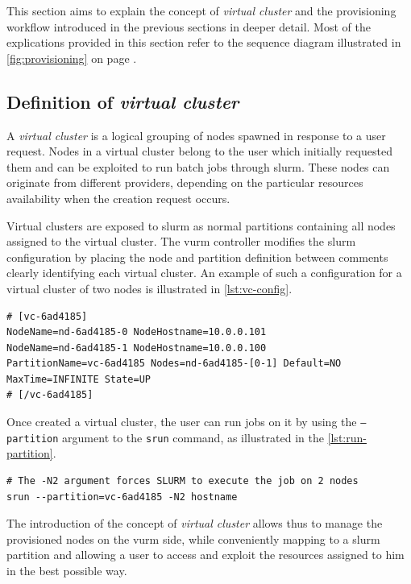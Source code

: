 This section aims to explain the concept of \emph{virtual cluster} and the provisioning workflow introduced in the previous sections in deeper detail. Most of the explications provided in this section refer to the sequence diagram illustrated in \autoref{fig:provisioning} on page \pageref{fig:provisioning}. 

\subsection{Definition of \emph{virtual cluster}}

A \emph{virtual cluster} is a logical grouping of nodes spawned in response to a user request. Nodes in a virtual cluster belong to the user which initially requested them and can be exploited to run batch jobs through \gls{slurm}. These nodes can originate from different providers, depending on the particular resources availability when the creation request occurs.

Virtual clusters are exposed to \gls{slurm} as normal partitions containing all nodes assigned to the virtual cluster. The \gls{vurm} controller modifies the \gls{slurm} configuration by placing the node and partition definition between comments clearly identifying each virtual cluster. An example of such a configuration for a virtual cluster of two nodes is illustrated in \autoref{lst:vc-config}.

\lstset{language=bash,caption=SLURM configuration for a virtual cluster,label=lst:vc-config}
\begin{lstlisting}
# [vc-6ad4185]
NodeName=nd-6ad4185-0 NodeHostname=10.0.0.101
NodeName=nd-6ad4185-1 NodeHostname=10.0.0.100
PartitionName=vc-6ad4185 Nodes=nd-6ad4185-[0-1] Default=NO MaxTime=INFINITE State=UP
# [/vc-6ad4185]
\end{lstlisting}

Once created a virtual cluster, the user can run jobs on it by using the \texttt{--partition} argument to the \texttt{srun} command, as illustrated in the \autoref{lst:run-partition}.

\lstset{language=bash,caption=Batch job execution on a virtual cluster,label=lst:run-partition}
\begin{lstlisting}
# The -N2 argument forces SLURM to execute the job on 2 nodes
srun --partition=vc-6ad4185 -N2 hostname
\end{lstlisting}

The introduction of the concept of \emph{virtual cluster} allows thus to manage the provisioned nodes on the \gls{vurm} side, while conveniently mapping to a \gls{slurm} partition and allowing a user to access and exploit the resources assigned to him in the best possible way.

